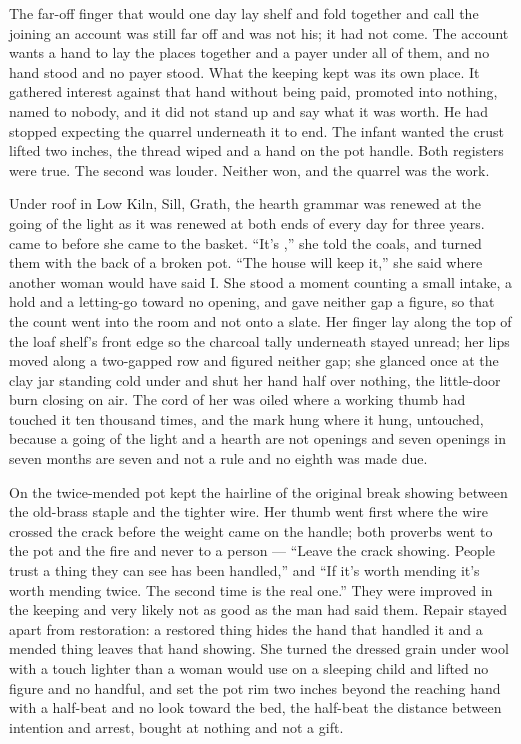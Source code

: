 The far-off finger that would one day lay shelf and fold together and call the joining an account was still far off and was not his; it had not come. The account wants a hand to lay the places together and a payer under all of them, and no hand stood and no payer stood. What the keeping kept was its own place. It gathered interest against that hand without being paid, promoted into nothing, named to nobody, and it did not stand up and say what it was worth. He had stopped expecting the quarrel underneath it to end. The infant wanted the crust lifted two inches, the thread wiped and a hand on the pot handle. Both registers were true. The second was louder. Neither won, and the quarrel was the work.

\scenebreak

Under  roof in Low Kiln, Sill, Grath, the hearth grammar was renewed at the going of the light as it was renewed at both ends of every day for three years.  came to  before she came to the basket. “It's ,” she told the coals, and turned them with the back of a broken pot. “The house will keep it,” she said where another woman would have said I. She stood a moment counting a small intake, a hold and a letting-go toward no opening, and gave neither gap a figure, so that the count went into the room and not onto a slate. Her finger lay along the top of the loaf shelf's front edge so the charcoal tally underneath stayed unread; her lips moved along a two-gapped row and figured neither gap; she glanced once at the clay jar standing cold under  and shut her hand half over nothing, the little-door burn closing on air. The cord of her  was oiled where a working thumb had touched it ten thousand times, and the mark hung where it hung, untouched, because a going of the light and a hearth are not openings and seven openings in seven months are seven and not a rule and no eighth was made due.

On  the twice-mended pot kept the hairline of the original break showing between the old-brass staple and the tighter wire. Her thumb went first where the wire crossed the crack before the weight came on the handle; both proverbs went to the pot and the fire and never to a person — “Leave the crack showing. People trust a thing they can see has been handled,” and “If it's worth mending it's worth mending twice. The second time is the real one.” They were improved in the keeping and very likely not as good as the man had said them. Repair stayed apart from restoration: a restored thing hides the hand that handled it and a mended thing leaves that hand showing. She turned the dressed grain under wool with a touch lighter than a woman would use on a sleeping child and lifted no figure and no handful, and set the pot rim two inches beyond the reaching hand with a half-beat and no look toward the bed, the half-beat the distance between intention and arrest, bought at nothing and not a gift.

